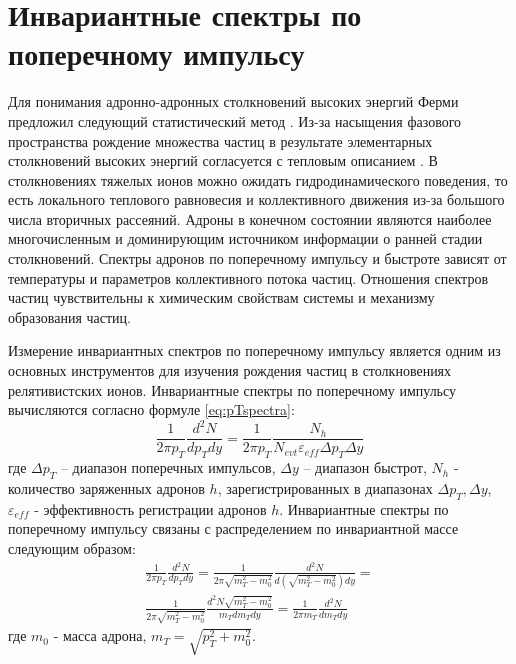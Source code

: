 \section{Инвариантные спектры по поперечному импульсу} \label{sectRes_spectra}
Для понимания адронно-адронных столкновений высоких энергий Ферми предложил следующий статистический метод \cite{ThermalModel}. Из-за насыщения фазового пространства рождение множества частиц в результате элементарных столкновений высоких энергий согласуется с тепловым описанием \cite{Thermal1, Thermal2, ThermalModel}. В столкновениях тяжелых ионов можно ожидать гидродинамического поведения, то есть локального теплового равновесия и коллективного движения из-за большого числа вторичных рассеяний. Адроны в конечном состоянии являются наиболее многочисленным и доминирующим источником информации о ранней стадии столкновений. Спектры адронов по поперечному импульсу и быстроте зависят от температуры и параметров коллективного потока частиц. Отношения спектров частиц чувствительны к химическим свойствам системы и механизму образования частиц.

Измерение инвариантных спектров по поперечному импульсу является одним из основных инструментов для изучения рождения частиц в столкновениях релятивистских ионов.
Инвариантные спектры по поперечному импульсу вычисляются согласно формуле \ref{eq:pTspectra}:
\begin{equation}
	\label{eq:pTspectra}
	\frac{1}{2\pi p_T} \frac{d^2 N}{dp_T dy}=\frac{1}{2\pi p_T}\frac{N_h}{N_{evt} \varepsilon_{eff} \Delta p_T \Delta y}
\end{equation}
где $\Delta p_T$ – диапазон поперечных импульсов, $\Delta y$ – диапазон быстрот, $N_h$ - количество заряженных адронов $h$, зарегистрированных в диапазонах  $\Delta p_T, \Delta y$,  $\varepsilon_{eff}$ - эффективность регистрации адронов $h$.
Инвариантные спектры по поперечному импульсу связаны с распределением по инвариантной массе следующим образом:
\begin{equation}
	\label{eq:mTspectra}
	\begin{split}
		\frac{1}{2\pi p_T} \frac{d^2 N}{dp_T dy}=
		\frac{1}{2\pi \sqrt{m_T^2-m_0^2}} \frac{d^2 N}{d(\sqrt{m_T^2-m_0^2})dy}=\\
		\frac{1}{2\pi \sqrt{m_T^2-m_0^2}} \frac{d^2 N \sqrt{m_T^2-m_0^2}}{m_T dm_Tdy}=\frac{1}{2\pi m_T} \frac{d^2 N}{dm_Tdy}
	\end{split}
\end{equation}
где $m_0$ - масса адрона, $m_T = \sqrt{p_{T}^{2}+m_0^2}$.


